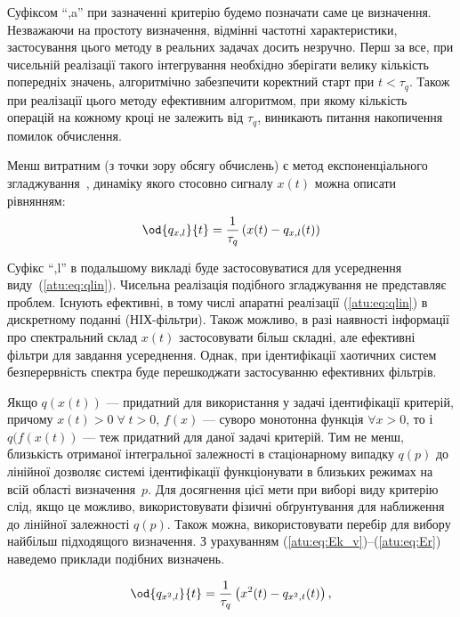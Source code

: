 Суфіксом ``,a'' при зазначенні критерію будемо позначати саме це
визначення. Незважаючи на простоту визначення, відмінні частотні
характеристики, застосування цього методу в реальних задачах
досить незручно. Перш за все, при чисельній реалізації такого
інтегрування необхідно зберігати велику кількість попередніх
значень, алгоритмічно забезпечити коректний старт при
$t < \tau_q$. Також при реалізації цього методу ефективним алгоритмом,
при якому кількість операцій на кожному кроці не залежить від
$\tau_q$, виникають питання накопичення помилок обчислення.

Менш витратним (з точки зору обсягу обчислень) є метод експоненціального
згладжування~\cite{rastr_stat_meth_search},
динаміку якого стосовно сигналу $x(t)$ можна описати
рівнянням:
%
\begin{equation}
\od{q_{x,l}}{t}
=
\frac{1}{\tau_q} \left( x(t) - q_{x,l}(t) \right)
\label{atu:eq:qlin}
\end{equation}

Суфікс ``,l'' в подальшому викладі буде застосовуватися для
усереднення виду~(\ref{atu:eq:qlin}). Чисельна реалізація подібного
згладжування не представляє проблем. Існують ефективні, в тому
числі апаратні реалізації (\ref{atu:eq:qlin}) в дискретному поданні
(НІХ-фільтри). Також можливо, в разі наявності інформації про
спектральний склад
$x(t)$ застосовувати більш складні, але ефективні фільтри для завдання
усереднення. Однак, при ідентифікації хаотичних систем
безперервність спектра буде перешкоджати застосуванню
ефективних фільтрів.


Якщо
$q(x(t))$ --- придатний для використання у задачі ідентифікації критерій,
причому
$x(t) > 0 \; \forall \; t> 0$,
$f(x)$ --- суворо монотонна функція
$\forall x > 0$, то і
$q(f(x(t))$ --- теж придатний для даної задачі критерій. Тим
не менш, близькість отриманої інтегральної залежності в
стаціонарному випадку
$q(p)$ до лінійної дозволяє системі ідентифікації функціонувати
в близьких режимах на всій області визначення~$p$.
Для досягнення цієї мети при виборі виду критерію слід, якщо
це можливо, використовувати фізичні обґрунтування для наближення
до лінійної залежності $q(p)$.
Також можна, використовувати перебір для вибору найбільш
підходящого визначення. З урахуванням (\ref{atu:eq:Ek_v})--(\ref{atu:eq:Er})
наведемо приклади подібних визначень.


\begin{equation}
\od{q_{x^2,l}}{t}
=
\frac{1}{\tau_q} \left( x^2(t) - q_{x^2,t}(t) \right)
,
\label{atu:eq:qx2l}
\end{equation}

